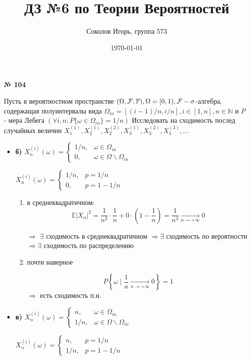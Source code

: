 \documentclass[a4paper,12pt]{article}
\author{Соколов Игорь, группа 573}
\title{ДЗ №6 по Теории Вероятностей }
\date{\today}
\newcommand{\lt}{\left}
\newcommand{\rt}{\right}
\newcommand{\fr}{\frac}
\newcommand{\bb}{\mathbb}
\newcommand{\om}{\Omega}
\newcommand{\mc}{\mathcal}
\begin{document}

\maketitle

\textbf {№ 104}

Пусть в вероятностном пространстве $(\Omega, \mc F, \bb P), \Omega = [0,1), \mc F \-- \sigma$-алгебра, содержащая полуинтервалы вида $\om_{in} = [(i-1)/n, i/n], i \in [1, n], n\in \bb N$  и $P$ - мера Лебега $(\forall i, n :P\{\omega \in \om_{in}\}= 1/n)$
Исследовать на сходимость послед случайных величин $X_1^{(1)},X_2^{(1)},X_2^{(2)},X_3^{(1)},X_3^{(2)},X_3^{(3)},...$
\begin{itemize}
\item \textbf{б)}
$X_n^{(i)}(\omega) = 
\begin{cases}
1/n,& \omega \in \om_{in}\\
0,& \omega \in \om\backslash\om_{in}
\end{cases}
$

	$X_n^{(i)}(\omega) = 
	\begin{cases}
	1/n,& p = 1/n\\
	0,& p = 1 - 1/n
	\end{cases}
	$

\begin{enumerate}
	\item в среднеквадратичном:
	$$\bb E|X_n|^2 = \fr{1}{n^2}\cdot\fr{1}{n} + 0\cdot \lt(1 - \fr{1}{n}\rt) = \fr{1}{n^3} \xrightarrow[n \to +\infty]{} 0 $$
	
	$\Rightarrow$
	$\exists$ сходимость в среднеквадратичном $\Rightarrow \exists$ сходимость по вероятности $\Rightarrow \exists$ сходимость по распределению
	\item почти наверное
	
	$$P\lt\{\omega\mid \fr{1}{n}\xrightarrow[n \to +\infty]{} 0 \rt\} = 1$$
	$\Rightarrow$ есть сходимость п.н.
\end{enumerate}

\item \textbf{в)} $X_n^{(i)}(\omega) = 
\begin{cases}
n,& \omega \in \om_{in}\\
1/n,& \omega \in \om\backslash\om_{in}
\end{cases}
$

$X_n^{(i)}(\omega) = 
\begin{cases}
n,& p = 1/n\\
1/n,& p =  1 - 1/n
\end{cases}
$


\end{itemize}
\end{document}
